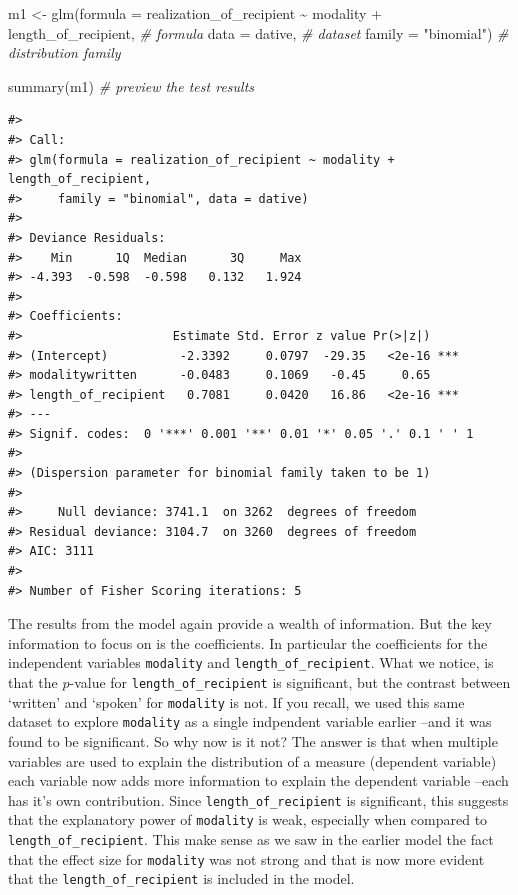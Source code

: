 \documentclass[
  letterpaper,
]{latex/krantz}
\newenvironment{Shaded}{\begin{snugshade}}{\end{snugshade}}
\newcommand{\AttributeTok}[1]{\textcolor[rgb]{0.00,0.00,0.00}{#1}}
\newcommand{\CommentTok}[1]{\textcolor[rgb]{0.00,0.00,0.00}{\textit{#1}}}
\newcommand{\FunctionTok}[1]{\textcolor[rgb]{0.00,0.00,0.00}{#1}}
\newcommand{\NormalTok}[1]{\textcolor[rgb]{0.00,0.00,0.00}{#1}}
\newcommand{\OtherTok}[1]{\textcolor[rgb]{0.00,0.00,0.00}{#1}}
\newcommand{\SpecialCharTok}[1]{\textcolor[rgb]{0.00,0.00,0.00}{#1}}
\newcommand{\StringTok}[1]{\textcolor[rgb]{0.00,0.00,0.00}{#1}}
\begin{document}
\begin{Shaded}
\begin{Highlighting}[]
\NormalTok{m1 }\OtherTok{\textless{}{-}} \FunctionTok{glm}\NormalTok{(}\AttributeTok{formula =}\NormalTok{ realization\_of\_recipient }\SpecialCharTok{\textasciitilde{}}\NormalTok{ modality }\SpecialCharTok{+}\NormalTok{ length\_of\_recipient, }\CommentTok{\# formula}
          \AttributeTok{data =}\NormalTok{ dative, }\CommentTok{\# dataset}
          \AttributeTok{family =} \StringTok{"binomial"}\NormalTok{) }\CommentTok{\# distribution family}

\FunctionTok{summary}\NormalTok{(m1) }\CommentTok{\# preview the test results}
\end{Highlighting}
\end{Shaded}

\begin{verbatim}
#> 
#> Call:
#> glm(formula = realization_of_recipient ~ modality + length_of_recipient, 
#>     family = "binomial", data = dative)
#> 
#> Deviance Residuals: 
#>    Min      1Q  Median      3Q     Max  
#> -4.393  -0.598  -0.598   0.132   1.924  
#> 
#> Coefficients:
#>                     Estimate Std. Error z value Pr(>|z|)    
#> (Intercept)          -2.3392     0.0797  -29.35   <2e-16 ***
#> modalitywritten      -0.0483     0.1069   -0.45     0.65    
#> length_of_recipient   0.7081     0.0420   16.86   <2e-16 ***
#> ---
#> Signif. codes:  0 '***' 0.001 '**' 0.01 '*' 0.05 '.' 0.1 ' ' 1
#> 
#> (Dispersion parameter for binomial family taken to be 1)
#> 
#>     Null deviance: 3741.1  on 3262  degrees of freedom
#> Residual deviance: 3104.7  on 3260  degrees of freedom
#> AIC: 3111
#> 
#> Number of Fisher Scoring iterations: 5
\end{verbatim}

The results from the model again provide a wealth of information. But
the key information to focus on is the coefficients. In particular the
coefficients for the independent variables \texttt{modality} and
\texttt{length\_of\_recipient}. What we notice, is that the \(p\)-value
for \texttt{length\_of\_recipient} is significant, but the contrast
between `written' and `spoken' for \texttt{modality} is not. If you
recall, we used this same dataset to explore \texttt{modality} as a
single indpendent variable earlier --and it was found to be significant.
So why now is it not? The answer is that when multiple variables are
used to explain the distribution of a measure (dependent variable) each
variable now adds more information to explain the dependent variable
--each has it's own contribution. Since \texttt{length\_of\_recipient}
is significant, this suggests that the explanatory power of
\texttt{modality} is weak, especially when compared to
\texttt{length\_of\_recipient}. This make sense as we saw in the earlier
model the fact that the effect size for \texttt{modality} was not strong
and that is now more evident that the \texttt{length\_of\_recipient} is
included in the model.
\end{document}
